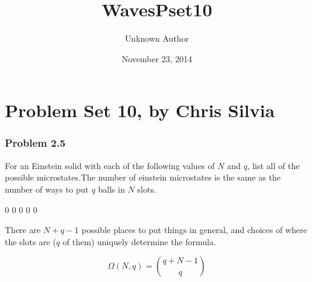 \documentclass[letterpaper,10pt,english]{/usr/local/lib/python2.7/dist-packages/sphinx/texinputs/sphinxhowto}
\title{WavesPset10}
\date{November 23, 2014}
\author{Unknown Author}
\begin{document}
        
            \maketitle
        

        


        
        \section{Problem Set 10, by Chris Silvia}\subsubsection{Problem 2.5}For an Einstein solid with each of the following values of \(N\) and
\(q\), list all of the possible microstates.The number of einstein microstates is the same as the number of ways to
put \(q\) balls in \(N\) slots.

0 0 0 \textbar{} \textbar{} 0 0 \textbar{}

There are \(N + q - 1\) possible places to put things in general, and
choices of where the slots are (\(q\) of them) uniquely determine the
formula.

\[
\Omega(N,q) = {{q + N -1} \choose q}
\]

\end{document}
